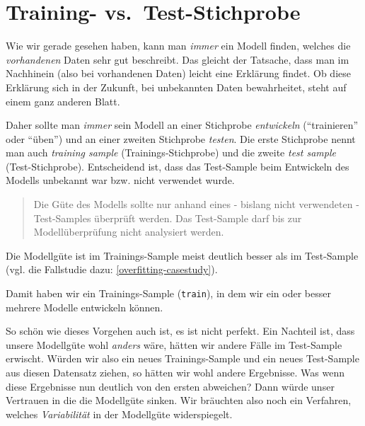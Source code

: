 \documentclass[12pt,ngerman,]{book}
\makeatletter
\newenvironment{Shaded}{\begin{snugshade}}{\end{snugshade}}
\newcommand{\KeywordTok}[1]{\textcolor[rgb]{0.13,0.29,0.53}{\textbf{{#1}}}}
\newcommand{\DataTypeTok}[1]{\textcolor[rgb]{0.13,0.29,0.53}{{#1}}}
\newcommand{\DecValTok}[1]{\textcolor[rgb]{0.00,0.00,0.81}{{#1}}}
\newcommand{\StringTok}[1]{\textcolor[rgb]{0.31,0.60,0.02}{{#1}}}
\newcommand{\CommentTok}[1]{\textcolor[rgb]{0.56,0.35,0.01}{\textit{{#1}}}}
\newcommand{\OtherTok}[1]{\textcolor[rgb]{0.56,0.35,0.01}{{#1}}}
\newcommand{\NormalTok}[1]{{#1}}
\newenvironment{kframe}{%
\medskip{}
\setlength{\fboxsep}{.8em}
 \def\at@end@of@kframe{}%
 \ifinner\ifhmode%
  \def\at@end@of@kframe{\end{minipage}}%
  \begin{minipage}{\columnwidth}%
 \fi\fi%
 \def\FrameCommand##1{\hskip\@totalleftmargin \hskip-\fboxsep
 \colorbox{shadecolor}{##1}\hskip-\fboxsep
     \hskip-\linewidth \hskip-\@totalleftmargin \hskip\columnwidth}%
 \MakeFramed {\advance\hsize-\width
   \@totalleftmargin\z@ \linewidth\hsize
   \@setminipage}}%
 {\par\unskip\endMakeFramed%
 \at@end@of@kframe}
\renewenvironment{Shaded}{\begin{kframe}}{\end{kframe}}
\makeatother
\begin{document}
\section{Training-
vs.~Test-Stichprobe}\label{training--vs.test-stichprobe}

Wie wir gerade gesehen haben, kann man \emph{immer} ein Modell finden,
welches die \emph{vorhandenen} Daten sehr gut beschreibt. Das gleicht
der Tatsache, dass man im Nachhinein (also bei vorhandenen Daten) leicht
eine Erklärung findet. Ob diese Erklärung sich in der Zukunft, bei
unbekannten Daten bewahrheitet, steht auf einem ganz anderen Blatt.

Daher sollte man \emph{immer} sein Modell an einer Stichprobe
\emph{entwickeln} (``trainieren'' oder ``üben'') und an einer zweiten
Stichprobe \emph{testen}. Die erste Stichprobe nennt man auch
\emph{training sample} (Trainings-Stichprobe) und die zweite \emph{test
sample} (Test-Stichprobe). Entscheidend ist, dass das Test-Sample beim
Entwickeln des Modells unbekannt war bzw. nicht verwendet wurde.

\begin{quote}
Die Güte des Modells sollte nur anhand eines - bislang nicht verwendeten
- Test-Samples überprüft werden. Das Test-Sample darf bis zur
Modellüberprüfung nicht analysiert werden.
\end{quote}

Die Modellgüte ist im Trainings-Sample meist deutlich besser als im
Test-Sample (vgl. die Fallstudie dazu: \ref{overfitting-casestudy}).

\begin{Shaded}
\end{Shaded}

Damit haben wir ein Trainings-Sample (\texttt{train}), in dem wir ein
oder besser mehrere Modelle entwickeln können.

So schön wie dieses Vorgehen auch ist, es ist nicht perfekt. Ein
Nachteil ist, dass unsere Modellgüte wohl \emph{anders} wäre, hätten wir
andere Fälle im Test-Sample erwischt. Würden wir also ein neues
Trainings-Sample und ein neues Test-Sample aus diesen Datensatz ziehen,
so hätten wir wohl andere Ergebnisse. Was wenn diese Ergebnisse nun
deutlich von den ersten abweichen? Dann würde unser Vertrauen in die die
Modellgüte sinken. Wir bräuchten also noch ein Verfahren, welches
\emph{Variabilität} in der Modellgüte widerspiegelt.
\end{document}
